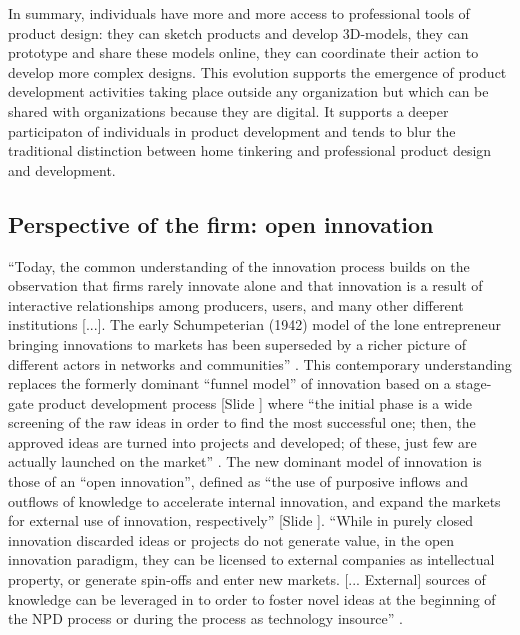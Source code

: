 \documentclass{article}
\newcounter{slide}
\begin{document}
In summary, individuals have more and more access to professional tools of product design: they can sketch products and develop 3D-models, they can prototype and share these models online, they can coordinate their action to develop more complex designs. This evolution supports the emergence of product development activities taking place outside any organization but which can be shared with organizations because they are digital. It supports a deeper participaton of individuals in product development and tends to blur the traditional distinction between home tinkering and professional product design and development.  

\subsection{Perspective of the firm: open innovation}
\label{sec:OI}
``Today, the common understanding of the innovation process builds on the observation that firms rarely innovate alone and that innovation is a result of interactive relationships among producers, users, and many other different institutions [...]. The early Schumpeterian (1942) model of the lone entrepreneur bringing innovations
to markets has been superseded by a richer picture of different actors in networks and communities'' \cite{pillerSocialMediaSocial2011}. This contemporary understanding replaces the formerly dominant ``funnel model'' of innovation based on a stage-gate product development process {\color{blue}[Slide ]} where ``the initial phase is a wide screening of the raw ideas in order to find the most successful one; then, the approved ideas are turned into projects and developed; of these, just few are actually launched on the market'' \cite{colombo2016open}. The new dominant model of innovation is those of an ``open innovation'', defined as ``the use of purposive inflows and outflows of knowledge to accelerate internal innovation, and expand the markets for external use of innovation, respectively'' \cite{chesbroughOpenInnovationNew2006}{\color{blue}[Slide ]}. ``While in purely closed innovation discarded ideas or projects do not generate value, in the open innovation paradigm, they can be licensed to external companies as intellectual property, or generate spin-offs and enter new markets. [... External] sources of knowledge can be leveraged in to order to foster novel ideas at the beginning of the NPD process or during the process as technology insource'' \cite{colombo2016open}.
\end{document}
